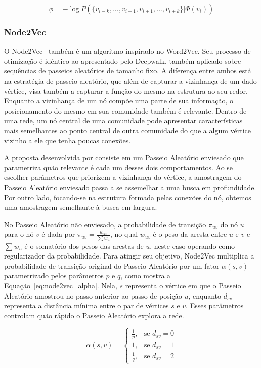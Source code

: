 \begin{equation} \label{eq:deepwalk_cost}
    \phi = -\log P(\{v_{i-k},...,v_{i-1},v_{i+1},...,v_{i+k}\}|\Phi(v_i))
\end{equation}

\subsubsection{Node2Vec}

O Node2Vec~\cite{grover16} também é um algoritmo inspirado no Word2Vec.
Seu processo de otimização é idêntico ao apresentado pelo Deepwalk, também
aplicado sobre sequências de passeios aleatórios de tamanho fixo.
A diferença entre ambos está na estratégia de passeio aleatório, que além de
capturar a vizinhança de um dado vértice, visa também a capturar a função do
mesmo na estrutura ao seu redor.
Enquanto a vizinhança de um nó compõe uma parte de sua informação, o
posicionamento do mesmo em sua comunidade também é relevante.
Dentro de uma rede, um nó central de uma comunidade pode apresentar
características mais semelhantes ao ponto central de outra comunidade
do que a algum vértice vizinho a ele que tenha poucas conexões.

A proposta desenvolvida por \citet{grover16} consiste em um Passeio Aleatório
enviesado que parametriza quão relevante é cada um desses dois comportamentos.
Ao se escolher parâmetros que priorizem a vizinhança do vértice, a amostragem do
Passeio Aleatório enviesado passa a se assemelhar a uma busca em profundidade.
Por outro lado, focando-se na estrutura formada pelas conexões do nó, obtemos uma
amostragem semelhante à busca em largura.

No Passeio Aleatório não enviesado, a probabilidade de transição $\pi_{uv}$ do
nó $u$ para o nó $v$ é dada por $\pi_{uv} = \frac{w_{uv}}{\sum{w_u}}$, no qual
$w_{uv}$ é o peso da aresta entre $u$ e $v$ e $\sum{w_u}$ é o somatório dos
pesos das arestas de $u$, neste caso operando como regularizador da probabilidade.
Para atingir seu objetivo, Node2Vec multiplica a probabilidade de transição
original do Passeio Aleatório por um fator $\alpha(s, v)$ parametrizado pelos
parâmetros $p$ e $q$, como mostra a Equação~\ref{eq:node2vec_alpha}.
Nela, $s$ representa o vértice em que o Passeio Aleatório amostrou no passo
anterior ao passo de posição $u$, enquanto $d_{sv}$ representa a distância
mínima entre o par de vértices $s$ e $v$.
Esses parâmetros controlam quão rápido o Passeio Aleatório explora a rede.

\begin{equation} \label{eq:node2vec_alpha}
    \alpha(s, v) =
    \begin{cases}
        \frac{1}{p} ,& \text{se } d_{sv} = 0\\
        1           ,& \text{se } d_{sv} = 1\\
        \frac{1}{q} ,& \text{se } d_{sv} = 2
    \end{cases}
\end{equation}

